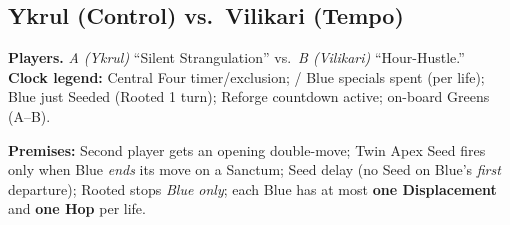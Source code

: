 \subsection*{Ykrul (Control) vs.\ Vilikari (Tempo)}

\noindent\textbf{Players.} \textit{A (Ykrul)} ``Silent Strangulation'' vs.\ \textit{B (Vilikari)} ``Hour-Hustle.''\\
\textbf{Clock legend:} \CC{\dots} Central Four timer/exclusion;\; / Blue specials spent (per life);\; \RoC{} Blue just Seeded (Rooted 1 turn);\; \RC{} Reforge countdown active;\;  on-board Greens (A--B).

\medskip
\noindent\textbf{Premises:} Second player gets an opening double-move; Twin Apex Seed fires only when Blue \emph{ends} its move on a Sanctum; Seed delay (no Seed on Blue's \emph{first} departure); Rooted stops \emph{Blue only}; each Blue has at most \textbf{one Displacement} and \textbf{one Hop} per life.

\bigskip

